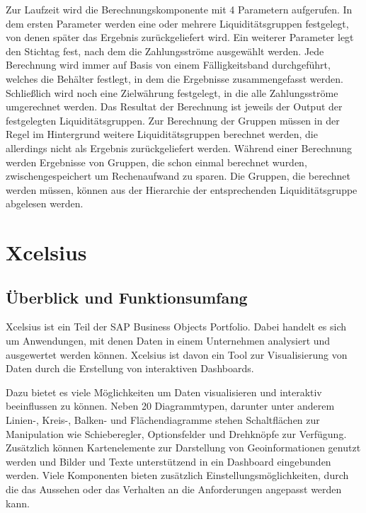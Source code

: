 Zur Laufzeit wird die Berechnungskomponente mit 4 Parametern aufgerufen. In dem ersten Parameter werden eine oder mehrere Liquiditätsgruppen festgelegt, von denen später das Ergebnis zurückgeliefert wird. Ein weiterer Parameter legt den Stichtag fest, nach dem die Zahlungsströme ausgewählt werden. Jede Berechnung wird immer auf Basis von einem Fälligkeitsband durchgeführt, welches die Behälter festlegt, in dem die Ergebnisse zusammengefasst werden. Schließlich wird noch eine Zielwährung festgelegt, in die alle Zahlungsströme umgerechnet werden. Das Resultat der Berechnung ist jeweils der Output der festgelegten Liquiditätsgruppen. Zur Berechnung der Gruppen müssen in der Regel im Hintergrund weitere Liquiditätsgruppen berechnet werden, die allerdings nicht als Ergebnis zurückgeliefert werden. Während einer Berechnung werden Ergebnisse von Gruppen, die schon einmal berechnet wurden, zwischengespeichert um Rechenaufwand zu sparen. Die Gruppen, die berechnet werden müssen, können aus der Hierarchie der entsprechenden Liquiditätsgruppe abgelesen werden.

\section{Xcelsius}
\subsection{Überblick und Funktionsumfang} %
Xcelsius ist ein Teil der SAP Business Objects Portfolio. Dabei handelt es sich um Anwendungen, mit denen Daten in einem Unternehmen analysiert und ausgewertet werden können. Xcelsius ist davon ein Tool zur Visualisierung von Daten durch die Erstellung von interaktiven Dashboards.

Dazu bietet es viele Möglichkeiten um Daten visualisieren und interaktiv beeinflussen zu können. Neben 20 Diagrammtypen, darunter unter anderem Linien-, Kreis-, Balken-  und Flächendiagramme stehen Schaltflächen zur Manipulation wie Schieberegler, Optionsfelder und Drehknöpfe zur Verfügung. Zusätzlich können Kartenelemente zur Darstellung von Geoinformationen genutzt werden und Bilder und Texte unterstützend in ein Dashboard eingebunden werden. Viele Komponenten bieten zusätzlich Einstellungsmöglichkeiten, durch die das Aussehen oder das Verhalten an die Anforderungen angepasst werden kann.

